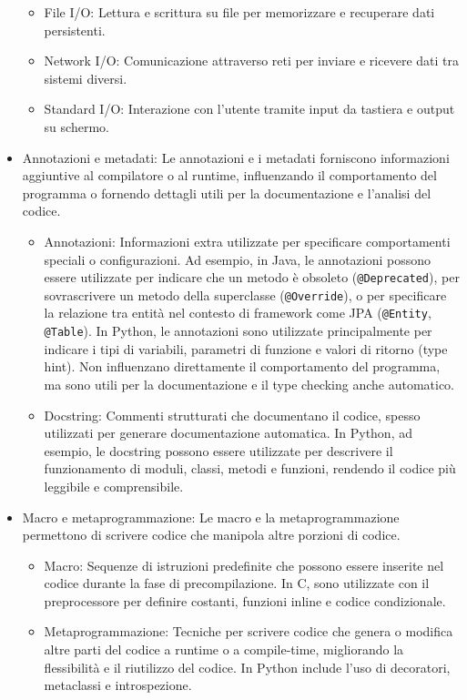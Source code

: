 \documentclass[
  letterpaper,
]{scrbook}
\providecommand{\tightlist}{%
  \setlength{\itemsep}{0pt}\setlength{\parskip}{0pt}}\usepackage{longtable,booktabs,array}
\begin{document}
\begin{itemize}
  \begin{itemize}
  \tightlist
  \item
    File I/O: Lettura e scrittura su file per memorizzare e recuperare
    dati persistenti.
  \item
    Network I/O: Comunicazione attraverso reti per inviare e ricevere
    dati tra sistemi diversi.
  \item
    Standard I/O: Interazione con l'utente tramite input da tastiera e
    output su schermo.
  \end{itemize}
\item
  Annotazioni e metadati: Le annotazioni e i metadati forniscono
  informazioni aggiuntive al compilatore o al runtime, influenzando il
  comportamento del programma o fornendo dettagli utili per la
  documentazione e l'analisi del codice.

  \begin{itemize}
  \tightlist
  \item
    Annotazioni: Informazioni extra utilizzate per specificare
    comportamenti speciali o configurazioni. Ad esempio, in Java, le
    annotazioni possono essere utilizzate per indicare che un metodo è
    obsoleto (\texttt{@Deprecated}), per sovrascrivere un metodo della
    superclasse (\texttt{@Override}), o per specificare la relazione tra
    entità nel contesto di framework come JPA (\texttt{@Entity},
    \texttt{@Table}). In Python, le annotazioni sono utilizzate
    principalmente per indicare i tipi di variabili, parametri di
    funzione e valori di ritorno (type hint). Non influenzano
    direttamente il comportamento del programma, ma sono utili per la
    documentazione e il type checking anche automatico.
  \item
    Docstring: Commenti strutturati che documentano il codice, spesso
    utilizzati per generare documentazione automatica. In Python, ad
    esempio, le docstring possono essere utilizzate per descrivere il
    funzionamento di moduli, classi, metodi e funzioni, rendendo il
    codice più leggibile e comprensibile.
  \end{itemize}
\item
  Macro e metaprogrammazione: Le macro e la metaprogrammazione
  permettono di scrivere codice che manipola altre porzioni di codice.

  \begin{itemize}
  \tightlist
  \item
    Macro: Sequenze di istruzioni predefinite che possono essere
    inserite nel codice durante la fase di precompilazione. In C, sono
    utilizzate con il preprocessore per definire costanti, funzioni
    inline e codice condizionale.
  \item
    Metaprogrammazione: Tecniche per scrivere codice che genera o
    modifica altre parti del codice a runtime o a compile-time,
    migliorando la flessibilità e il riutilizzo del codice. In Python
    include l'uso di decoratori, metaclassi e introspezione.
  \end{itemize}
\end{itemize}
\end{document}
